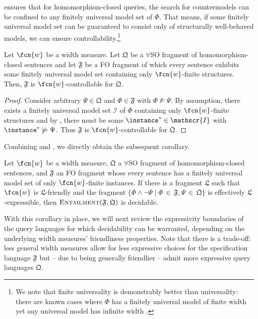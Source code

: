 %
 ensures that for homomorphism-closed queries, the search for countermodels can be confined to any finitely universal model set of $\Phi$. That means, if some finitely universal model set can be guaranteed to consist only of structurally well-behaved models, we can ensure controllability.\footnote{We note that finite universality is demonstrably better than universality: there are known cases where $\Phi$ has a finitely universal model of finite width yet any universal model has infinite width \cite{BMR2023}.} 
%
\begin{theorem}\label{thm:univmodelset}
Let $\fcn{w}$ be a width measure.
Let $\mathfrak{Q}$ be a $\forall$SO fragment of homomorphism-closed sentences and let $\mathfrak{F}$ be a FO fragment of which every sentence exhibits some finitely universal model set containing only $\fcn{w}$-finite structures. 
Then, $\mathfrak{F}$ is $\fcn{w}$-controllable for $\mathfrak{Q}$.
\end{theorem}
%
\begin{proof}
Consider arbitrary $\Psi \in \mathfrak{Q}$ and  $\Phi \in \mathfrak{F}$ with $\Phi \not \models \Psi$. By assumption, there exists a finitely universal model set $\mathscr{I}$ of $\Phi$ containing only $\fcn{w}$-finite structures and by , there must be some $\instance^* \in \mathscr{I}$ with $\instance^* \not\models \Psi$. Thus $\mathfrak{F}$ is $\fcn{w}$-controllable for $\mathfrak{Q}$.
\end{proof}
%
Combining  and , we directly obtain the subsequent corollary.
%
\begin{corollary}\label{cor:dechomquerying}
	Let $\fcn{w}$ be a width measure,
	$\mathfrak{Q}$ a $\forall$SO fragment of homomorphism-closed sen\-ten\-ces, and
	$\mathfrak{F}$ an FO fragment whose every sentence has a finitely universal model set of only $\fcn{w}$-finite instances.
	If there is a fragment $\mathfrak{L}$ such that $\fcn{w}$ is $\mathfrak{L}$-friendly
	and the fragment $\{\Phi \wedge \neg \Psi \mid \Phi {\,\in\,} \mathfrak{F}, \Psi {\,\in\,} \mathfrak{Q}\}$ is effectively 
	$\mathfrak{L}$-expressible, then $\textsc{Entailment}(\mathfrak{F},\mathfrak{Q})$ is decidable.
\end{corollary}
%
With this corollary in place, we will next review the expressivity boundaries of the query languages for which decidability can be warranted, depending on the underlying width measures' friendliness properties. 
Note that there is a trade-off: less general width measures allow for less expressive choices for the specification language $\mathfrak{F}$ but -- due to being generally friendlier -- admit more expressive query languages $\mathfrak{Q}$.




